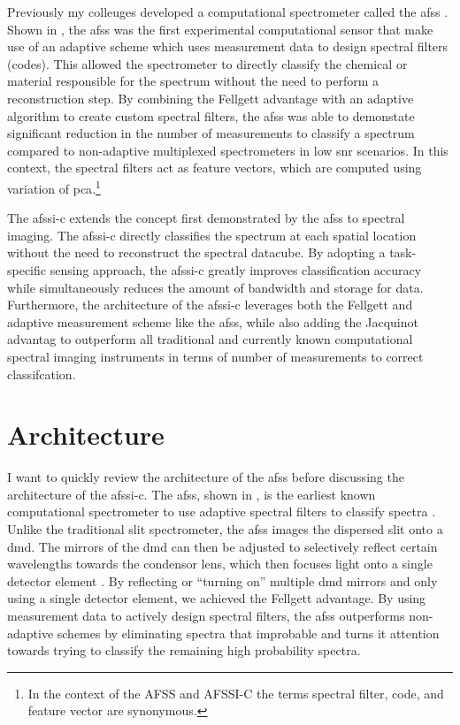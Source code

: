 Previously my colleuges developed a computational spectrometer called the \acrfull{afss} \cite{dinakarababu2011adaptive}. Shown in , the \gls{afss} was the first experimental computational sensor that make use of an adaptive scheme which uses measurement data to design spectral filters (codes). This allowed the spectrometer to directly classify the chemical or material responsible for the spectrum without the need to perform a reconstruction step. By combining the \gls{Fellgett advantage} with an adaptive algorithm to create custom spectral filters, the \gls{afss} was able to demonstate significant reduction in the number of measurements to classify a spectrum compared to non-adaptive multiplexed spectrometers in low \gls{snr} scenarios. In this context, the spectral filters act as feature vectors, which are computed using variation of \gls{pca}.\footnote{In the context of the AFSS and AFSSI-C the terms spectral filter, code, and feature vector are synonymous.}

The \acrfull{afssi-c} extends the concept first demonstrated by the \gls{afss} to spectral imaging. The \gls{afssi-c} directly classifies the spectrum at each spatial location without the need to reconstruct the spectral datacube. By adopting a task-specific sensing approach, the \gls{afssi-c} greatly improves classification accuracy while simultaneously reduces the amount of bandwidth and storage for data. Furthermore, the architecture of the \gls{afssi-c} leverages both the Fellgett and adaptive measurement scheme like the \gls{afss}, while also adding the Jacquinot advantag to outperform all traditional and currently known computational spectral imaging instruments in terms of number of measurements to correct classifcation.

\section{Architecture}\label{sec:afssicArchitecture}

I want to quickly review the architecture of the \acrfull{afss} before discussing the architecture of the \gls{afssi-c}. The \gls{afss}, shown in , is the earliest known computational spectrometer to use adaptive spectral filters to classify spectra \cite{dinakarababu2011adaptive}. Unlike the traditional slit spectrometer, the \gls{afss} images the dispersed slit onto a \gls{dmd}. The mirrors of the \gls{dmd} can then be adjusted to selectively reflect certain wavelengths towards the condensor lens, which then focuses light onto a single detector element \cite{dinakarababu2011adaptive}. By reflecting or ``turning on'' multiple \gls{dmd} mirrors and only using a single detector element, we achieved the \gls{Fellgett advantage}. By using measurement data to actively design spectral filters, the \gls{afss} outperforms non-adaptive schemes by eliminating spectra that improbable and turns it attention towards trying to classify the remaining high probability spectra. 

